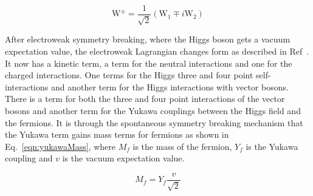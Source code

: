 \begin{equation}
\label{eqn:Wpm}
\textrm{W}^{\pm}=\frac{1}{\sqrt{2}}\left(\textrm{W}_{1}\mp i\textrm{W}_{2}\right)
\end{equation}





After electroweak symmetry breaking, where the Higgs boson gets a vacuum expectation value, the electroweak Lagrangian changes form as described in Ref~\cite{Pich:2005mk}. It now has a kinetic term, a term for the neutral interactions and one for the charged interactions. One terms for the Higgs three and four point self-interactions and another term for the Higgs interactions with vector bosons. There is a term for both the three and four point interactions of the vector bosons and another term for the Yukawa couplings between the Higgs field and the fermions. It is through the spontaneous symmetry breaking mechanism that the Yukawa term gains mass terms for fermions as shown in Eq.~\ref{eqn:yukawaMass}, where $M_f$ is the mass of the fermion, $Y_f$ is the Yukawa coupling and $v$ is the vacuum expectation value.

\begin{equation}
M_f = Y_f \frac{v}{\sqrt{2}}
\label{eqn:yukawaMass}
\end{equation}

